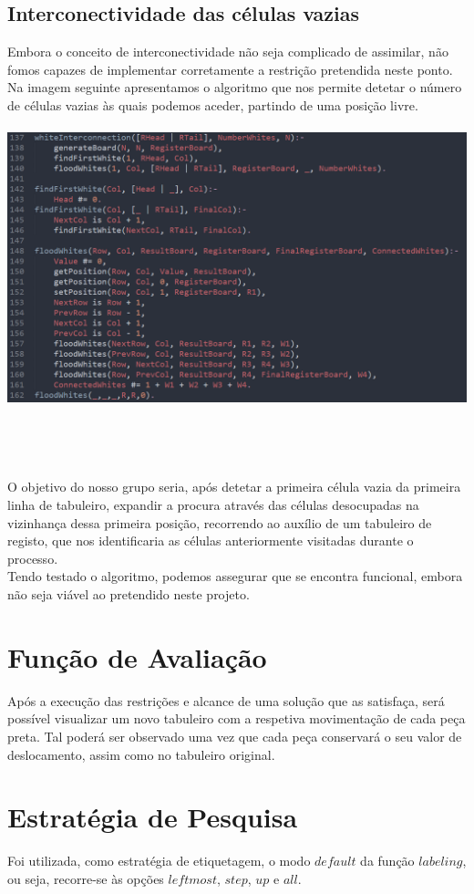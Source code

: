 \subsection{Interconectividade das c\'elulas vazias}
Embora o conceito de interconectividade n\~ao seja complicado de assimilar, n\~ao fomos capazes de implementar corretamente a restri\c{c}\~ao pretendida neste ponto.
Na imagem seguinte apresentamos o algoritmo que nos permite detetar o n\'umero de c\'elulas vazias \`as quais podemos aceder, partindo de uma posi\c{c}\~ao livre.
\\ \\ 
\includegraphics[scale= 0.5]{white-interconnection.png}
\\ \\ \\ \\ \\
O objetivo do nosso grupo seria, ap\'os detetar a primeira c\'elula vazia da primeira linha de tabuleiro, expandir a procura atrav\'es das c\'elulas desocupadas na vizinhan\c{c}a dessa primeira posi\c{c}\~ao, recorrendo ao aux\'ilio de um tabuleiro de registo, que nos identificaria as c\'elulas anteriormente visitadas durante o processo.\\
Tendo testado o algoritmo, podemos assegurar que se encontra funcional, embora n\~ao seja vi\'avel ao pretendido neste projeto.

\section{Fun\c{c}\~ao de Avalia\c{c}\~ao}
Ap\'os a execu\c{c}\~ao das restri\c{c}\~oes e alcance de uma solu\c{c}\~ao que as satisfa\c{c}a, ser\'a poss\'ivel visualizar um novo tabuleiro com a respetiva movimenta\c{c}\~ao de cada pe\c{c}a preta. Tal poder\'a ser observado uma vez que cada pe\c{c}a conservar\'a o seu valor de deslocamento, assim como no tabuleiro original.

\section{Estrat\'egia de Pesquisa}
Foi utilizada, como estrat\'egia de etiquetagem, o modo $default$ da fun\c{c}\~ao $labeling$, ou seja, recorre-se \`as op\c{c}\~oes $leftmost$, $step$, $up$ e $all$.

